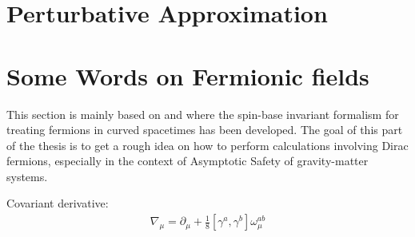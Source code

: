 \section{Perturbative Approximation}

\section{Some Words on Fermionic fields}
This section is mainly based on \cite{LippoldtPHD} and \cite{Lippoldt2015} where the spin-base invariant formalism for treating fermions in curved spacetimes has been developed. The goal of this part of the thesis is to get a rough idea on how to perform calculations involving Dirac fermions, especially in the context of Asymptotic Safety of gravity-matter systems.  

Covariant derivative:
\begin{align}
	\nabla_{\mu} = \partial_{\mu} + \frac{1}{8}\left[\gamma^{a}, \gamma^{b}\right]\omega_{\mu}^{ab}
\end{align}


